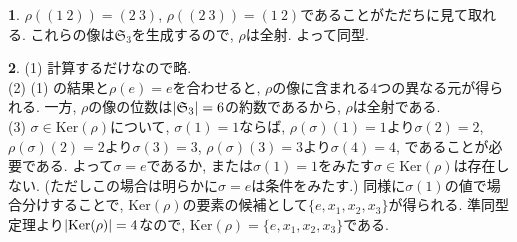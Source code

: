 \documentclass{amsart}
\theoremstyle{definition}
\newtheorem{ans}{}
\numberwithin{ans}{subsection}
\newcommand{\Ker}[1]{\mathrm{Ker}(#1)}
\DeclarePairedDelimiter{\abs}{\lvert}{\rvert}
\begin{document}
\begin{ans}
  $\rho((1\ 2)) = (2\ 3)$, $\rho((2\ 3)) = (1\ 2)$であることがただちに見て取れる.
  これらの像は$\mathfrak{S}_3$を生成するので, $\rho$は全射. よって同型.
\end{ans}

\begin{ans}
  (1) 計算するだけなので略.\\
  (2) (1) の結果と$\rho(e) = e$を合わせると, $\rho$の像に含まれる$4$つの異なる元が得られる.
  一方, $\rho$の像の位数は$\abs{\mathfrak{S}_3} = 6$の約数であるから, $\rho$は全射である.\\
  (3) $\sigma \in \Ker{\rho}$について, $\sigma(1) = 1$ならば,
  $\rho(\sigma)(1) = 1$より$\sigma(2) = 2$,
  $\rho(\sigma)(2) = 2$より$\sigma(3) = 3$,
  $\rho(\sigma)(3) = 3$より$\sigma(4) = 4$,
  であることが必要である.
  よって$\sigma = e$であるか, または$\sigma(1) = 1$をみたす$\sigma \in \Ker{\rho}$は存在しない. (ただしこの場合は明らかに$\sigma = e$は条件をみたす.)
  同様に$\sigma(1)$の値で場合分けすることで, $\Ker{\rho}$の要素の候補として$\{e, x_1, x_2, x_3\}$が得られる.
  準同型定理より$\abs{\Ker{\rho}} = 4$なので, $\Ker{\rho} = \{e, x_1, x_2, x_3\}$である.
\end{ans}
\end{document}
